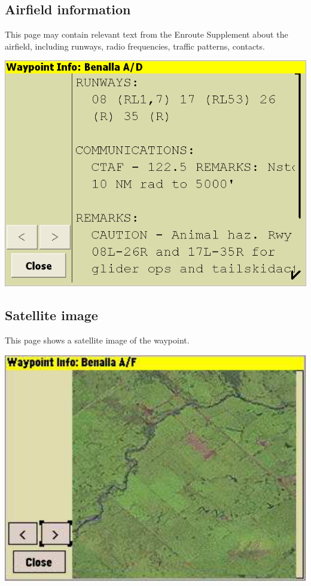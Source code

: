 \documentclass[a4paper,12pt]{refrep}
\begin{document}
\subsection*{Airfield information}
This page may contain relevant text from the Enroute Supplement about
the airfield, including runways, radio frequencies, traffic patterns,
contacts.
\begin{center}
\includegraphics[angle=0,width=\linewidth,keepaspectratio='true']{figures/dialog-waypointdetails1.png}
\end{center}

\subsection*{Satellite image}
This page shows a satellite image of the
waypoint.

\begin{center}
\includegraphics[angle=0,width=\linewidth,keepaspectratio='true']{figures/dialog-waypointdetails2.pdf}
\end{center}
\end{document}
